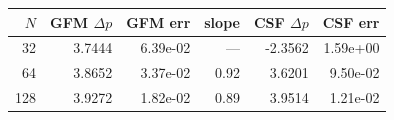 \begin{tabular}{rrrrrr}
\toprule
$N$ & GFM $\Delta p$ & GFM err & slope & CSF $\Delta p$ & CSF err \\
\midrule
32 & 3.7444 & 6.39e-02 & --- & -2.3562 & 1.59e+00 \\
64 & 3.8652 & 3.37e-02 & 0.92 & 3.6201 & 9.50e-02 \\
128 & 3.9272 & 1.82e-02 & 0.89 & 3.9514 & 1.21e-02 \\
\bottomrule
\end{tabular}
